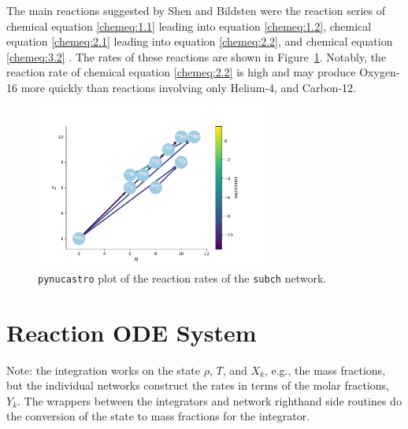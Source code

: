 The main reactions suggested by Shen and Bildsten were the reaction series of 
chemical equation \ref{chemeq:1.1} leading into equation \ref{chemeq:1.2}, 
chemical equation \ref{chemeq:2.1} leading into equation \ref{chemeq:2.2}, 
and chemical equation \ref{chemeq:3.2} \cite{ShenBildsten}. 
The rates of these reactions are shown in Figure~\ref{pynuc-subch}.
Notably, the reaction rate of chemical equation \ref{chemeq:2.2} is high and may produce Oxygen-16 more quickly than reactions involving only Helium-4, and Carbon-12. 

\begin{figure}
    \centering
    \includegraphics[width=3in]{subch.pdf}
    \caption{{\tt pynucastro} plot of the reaction rates of the {\tt subch} network.}
    \label{pynuc-subch}
\end{figure}


\section{Reaction ODE System}

\begin{tcolorbox}
Note: the integration works on the state $\rho$, $T$, and $X_k$, e.g., the
mass fractions, but the individual networks construct the rates in terms
of the molar fractions, $Y_k$.  The wrappers between the integrators and
network righthand side routines do the conversion of the state to mass
fractions for the integrator.
\end{tcolorbox}

